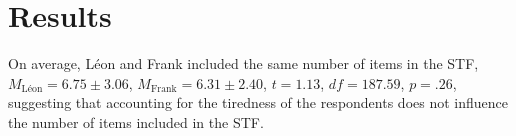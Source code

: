 \documentclass{svproc}
\begin{document}
\section{Results}

%

On average, Léon and Frank included the same number of items in the STF, $M_{\text{Léon}} = 6.75 \pm 3.06$, $M_{\text{Frank}} = 6.31 \pm 2.40$, $t = 1.13$, $df = 187.59$, $p = .26$, suggesting that accounting for the tiredness of the respondents does not influence the number of items included in the STF.
\end{document}

